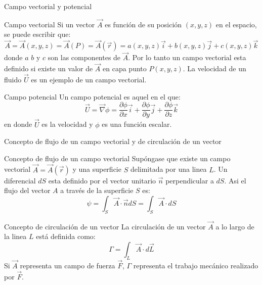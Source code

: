 \documentclass [xcolor=svgnames, t] {beamer}
\begin{document}
\begin{frame}{Campo vectorial y potencial}
\vspace{-0.5cm}
\begin{block}{Campo vectorial}
Si un vector $\vec{A}$ es funci\'on de su posici\'on $(x,y,z)$ en el espacio, se puede escribir que:
$$
\vec{A} = \vec{A}(x,y,z) = \vec{A}(P) = \vec{A}(\vec{r}) = a(x,y,z)\vec{i} + b(x,y,z)\vec{j} + c(x,y,z)\vec{k}
$$
donde $a$ $b$ y $c$ son las componentes de $\vec{A}$. Por lo tanto un \alert{campo vectorial} esta definido si existe un valor de $\vec{A}$ en capa punto $P(x,y,z)$. La velocidad de un fluido $\vec{U}$ es un ejemplo de un campo vectorial.
\end{block}
\begin{block}{Campo potencial}
Un campo potencial es aquel en el que:
$$
\vec{U} = \vec{\nabla} \phi = \frac{\partial \phi}{\partial x}\vec{i} + \frac{\partial \phi}{\partial y}\vec{j} + \frac{\partial \phi}{\partial z}\vec{k}
$$
en donde $\vec{U}$ es la velocidad y $\phi$ es una funci\'on escalar.
\end{block}
\end{frame}

\begin{frame}{Concepto de flujo de un campo vectorial y de circulaci\'on de un vector}
\vspace{-0.5cm}
\begin{block}{Concepto de flujo de un campo vectorial}
Sup\'ongase que existe un campo vectorial $\vec{A}=\vec{A}(\vec{r})$ y una superficie $S$ delimitada por una linea $L$. Un diferencial $dS$  esta definido por el vector unitario $\vec{n}$ perpendicular a $dS$. Asi el flujo del vector $A$ a trav\'es de la superficie $S$ es:
$$
\psi = \int_S \vec{A} \cdot \vec{n}dS = \int_S \vec{A} \cdot dS 
$$
\end{block}
\vspace{-0.23cm}
\begin{block}{Concepto de circulaci\'on de un vector}
La circulaci\'on de un vector $\vec{A}$ a lo largo de la linea $L$ est\'a definida como:
$$
\Gamma = \int_L \vec{A} \cdot d\vec{L}
$$
Si $\vec{A}$ representa un campo de fuerza $\vec{F}$, $\Gamma$ representa el trabajo mec\'anico realizado por $\vec{F}$.
\end{block}
\end{frame}
\end{document}
